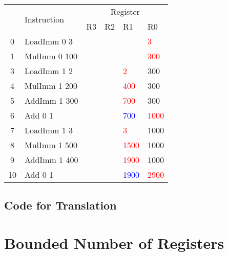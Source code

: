 \documentclass{report}
\newcommand{\hot}[1]{\textcolor{red}{#1}}
\newcommand{\old}[1]{\textcolor{blue}{#1}}
\begin{document}
            \begin{center}
                \begin{tabular}{c l | l l l l}
                    & \multirow{2}{*}{Instruction} & \multicolumn{4}{c}{Register} \\
                    & & R3 & R2 & R1 & R0 \\
                    \hline
                    0 & LoadImm 0 3   &     &        &          &   \hot{3} \\
                    1 & MulImm 0 100  &     &        &          & \hot{300} \\
                    3 & LoadImm 1 2   &     &        &   \hot{2}&       300 \\
                    4 & MulImm 1 200  &     &        & \hot{400}&       300 \\
                    5 & AddImm 1 300  &     &        & \hot{700}&       300 \\
                    6 & Add 0 1       &     &        &\old{700} &\hot{1000} \\
                    7 & LoadImm 1 3   &     &        &   \hot{3}&      1000 \\
                    8 & MulImm 1 500  &     &        &\hot{1500}&      1000 \\
                    9 & AddImm 1 400  &     &        &\hot{1900}&      1000 \\
                   10 & Add 0 1       &     &        &\old{1900}&\hot{2900} \\
                \end{tabular}
            \end{center}
        
        \subsection*{Code for Translation}
    
    \section*{Bounded Number of Registers}
\end{document}

